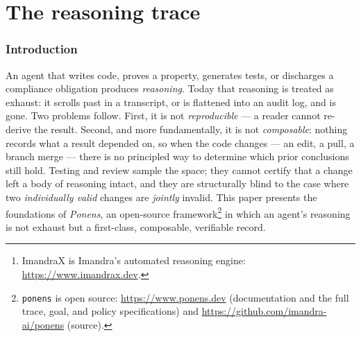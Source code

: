 \documentclass[11pt]{article}
\newcommand{\codeus}{\textunderscore\penalty100\relax}
\newcommand{\code}[1]{\texttt{\let\_\codeus #1}}
\begin{document}
\begin{abstract}
provably preserves --- the moment at which two individually-valid results can become jointly invalid. We
give a durable notion of component identity that lets evidence bind to code across renames and moves. The
\emph{entire framework} is given a formal model --- a single state-transition machine in which the trace is
the state --- and machine-checked in
ImandraX\footnote{ImandraX is Imandra's automated reasoning engine: \url{https://www.imandrax.dev}.}: every
invariant, both evidence-logic axes, and the merge composition are discharged over that one state, the system
verifying its own logic. The implementation is reasoner-agnostic at its core, with a concrete instantiation
over IML/ImandraX and a \code{git} post-merge trigger that reports, on a real merge, exactly which
established results the merge put at risk. Finally we argue the same construction underpins \emph{multi-reasoner} composition: a cross-branch
dependency and a cross-reasoner dependency are the same object --- an explicit, tracked assumption.
\end{abstract}

{\setcounter{tocdepth}{2}\tableofcontents}

\part{The reasoning trace}

\section{Introduction}

An agent that writes code, proves a property, generates tests, or discharges a compliance obligation
produces \emph{reasoning}. Today that reasoning is treated as exhaust: it scrolls past in a transcript, or
is flattened into an audit log, and is gone. Two problems follow. First, it is not \emph{reproducible} ---
a reader cannot re-derive the result. Second, and more fundamentally, it is not \emph{composable}: nothing
records what a result depended on, so when the code changes --- an edit, a pull, a branch merge --- there is
no principled way to determine which prior conclusions still hold. Testing and review sample the space; they
cannot certify that a change left a body of reasoning intact, and they are structurally blind to the case
where two \emph{individually valid} changes are \emph{jointly} invalid. This paper presents the foundations
of \emph{Ponens}, an open-source framework\footnote{\code{ponens} is open source: \url{https://www.ponens.dev}
(documentation and the full trace, goal, and policy specifications) and
\url{https://github.com/imandra-ai/ponens} (source).} in which an agent's reasoning is not exhaust but a
first-class, composable, verifiable record.
\end{document}
